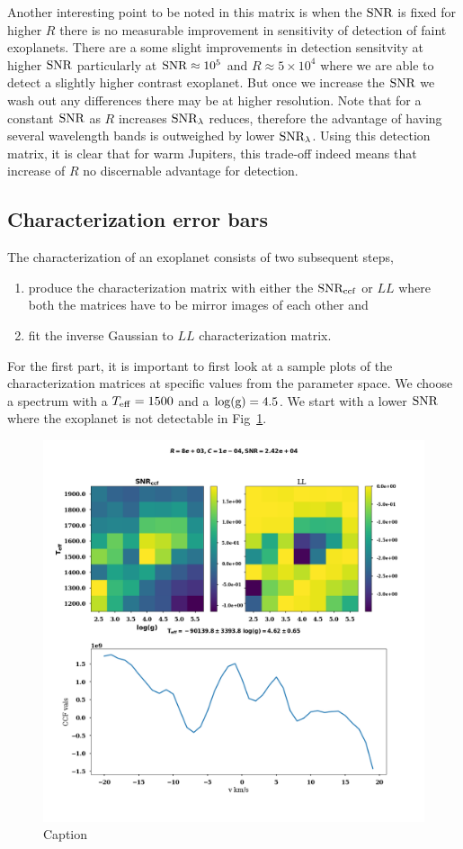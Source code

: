 Another interesting point to be noted in this matrix is when the $\rm{SNR}$ is fixed for higher $R$ there is no measurable improvement in sensitivity of detection of faint exoplanets.
There are a some slight improvements in detection sensitvity at higher $\rm{SNR}$ particularly at $\rm{SNR}\approx 10^{5}$ and $R\approx 5\times10^4$ where we are able to detect a slightly higher contrast exoplanet.
But once we increase the $\rm{SNR}$ we wash out any differences there may be at higher resolution.
Note that for a constant $\rm{SNR}$ as $R$ increases $\rm{SNR_{\lambda}}$ reduces, therefore the advantage of having several wavelength bands is outweighed by lower $\rm{SNR_{\lambda}}$.
Using this detection matrix, it is clear that for warm Jupiters, this trade-off indeed means that increase of $R$ no discernable advantage for detection.
\subsection{Characterization error bars }
\label{sec:char error bars}
The characterization of an exoplanet consists of two subsequent steps,
\begin{enumerate}
    \item produce the characterization matrix with either the $\rm{SNR_{ccf}}$ or $LL$ where both the matrices have to be mirror images of each other and
    \item fit the inverse Gaussian to $LL$ characterization matrix.
\end{enumerate}
For the first part, it is important to first look at a sample plots of the characterization matrices at specific values from the parameter space.
We choose a spectrum with a $T_{\rm{eff}}= 1500$ and a $\rm{\log(g)} = 4.5$.
We start with a lower $\rm{SNR}$ where the exoplanet is not detectable in Fig~\ref{fig:nondet_char}.
\begin{figure}[!h]
    \centering
    \includegraphics[scale=0.4]{images/Chapter3/char_plots_8e+03_1e-04_2.42e+04.png}
    \caption{Caption}
    \label{fig:nondet_char}
\end{figure}
